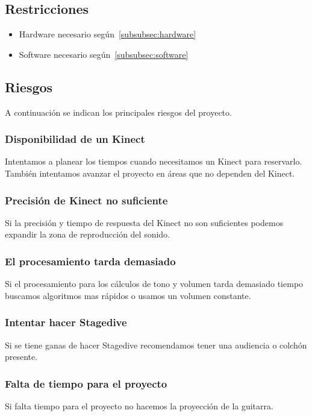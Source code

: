 \documentclass[a4paper,12pt]{article}
\begin{document}
\subsection{Restricciones}
\begin{itemize}
        \item Hardware necesario según~\ref{subsubsec:hardware}
        \item Software necesario según~\ref{subsubsec:software}
\end{itemize}

\subsection{Riesgos}
A continuación se indican los principales riesgos del proyecto.
\subsubsection{Disponibilidad de un Kinect}
Intentamos a planear los tiempos cuando necesitamos un Kinect para reservarlo.
También intentamos avanzar el proyecto en áreas que no dependen del Kinect.
\subsubsection{Precisión de Kinect no suficiente}
Si la precisión y tiempo de respuesta del Kinect no son suficientes podemos
expandir la zona de reproducción del sonido.
\subsubsection{El procesamiento tarda demasiado}
Si el procesamiento para los cálculos de tono y volumen tarda demasiado tiempo
buscamos algoritmos mas rápidos o usamos un volumen constante.
\subsubsection{Intentar hacer Stagedive}
Si se tiene ganas de hacer Stagedive recomendamos tener una audiencia o colchón
presente.
\subsubsection{Falta de tiempo para el proyecto}
Si falta tiempo para el proyecto no hacemos la proyección de la guitarra.

\newpage 
\appendix 
\newpage
\end{document}
